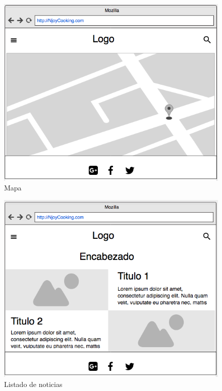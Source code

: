 \begin{figure}
\begin{center}
\includegraphics[width=1.0\textwidth]{imagenes/mapa.png}
\caption{Mapa}
\label{mapa}
\end{center}
\end{figure}

\begin{figure}
\begin{center}
\includegraphics[width=1.0\textwidth]{imagenes/listado-blog.png}
\caption{Listado de noticias}
\label{listado-blog}
\end{center}
\end{figure}

